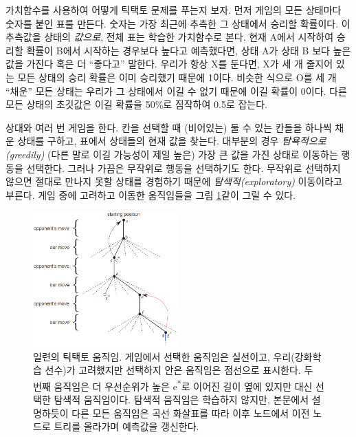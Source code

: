 가치함수를 사용하여 어떻게 틱택토 문제를 푸는지 보자. 먼저 게임의 모든 상태마다
숫자를 붙인 표를 만든다. 숫자는 가장 최근에 추측한 그 상태에서 승리할 확률이다.
이 추측값을 상태의 \emph{값으로}, 전체 표는 학습한 가치함수로 본다. 현재 A에서
시작하여 승리할 확률이 B에서 시작하는 경우보다 높다고 예측했다면, 상태 A가 상태
B 보다 높은 값을 가진다 혹은 더 ``좋다고'' 말한다. 우리가 항상 X를 둔다면, X가
세 개 줄지어 있는 모든 상태의 승리 확률은 이미 승리했기 때문에 1이다. 비슷한
식으로 O를 세 개 ``채운'' 모든 상태는 우리가 그 상태에서 이길 수 없기 때문에
이길 확률이 0이다. 다른 모든 상태의 초깃값은 이길 확률을 50\%로 짐작하여 0.5로
잡는다.

상대와 여러 번 게임을 한다. 칸을 선택할 때 (비어있는) 둘 수 있는 칸들을 하나씩
채운 상태를 구하고, 표에서 상태들의 현재 값을 찾는다. 대부분의 경우
\emph{탐욕적으로(greedily)} (다른 말로 이길 가능성이 제일 높은) 가장 큰 값을
가진 상태로 이동하는 행동을 선택한다. 그러나 가끔은 무작위로 행동을 선택하기도
한다. 무작위로 선택하지 않으면 절대로 만나지 못할 상태를 경험하기 때문에
\emph{탐색적(exploratory)} 이동이라고 부른다. 게임 중에 고려하고 이동한
움직임들을 그림 \ref{fig:sequence-of-tic-tac-toe-moves}\과 같이 그릴 수 있다.


\begin{figure}[h]
\centering
\includegraphics[width=0.5\textwidth]{img/figure_1_sequences_of_tic_tac_toe_moves.png}
\caption{\label{fig:sequence-of-tic-tac-toe-moves}일련의 틱택토 움직임. 게임에서
선택한 움직임은 실선이고, 우리(강화학습 선수)가 고려했지만 선택하지 안은
움직임은 점선으로 표시한다. 두 번째 움직임은 더 우선순위가 높은
e\textsuperscript{$\ast$}로 이어진 길이 옆에 있지만 대신 선택한 탐색적
움직임이다. 탐색적 움직임은 학습하지 않지만, 본문에서 설명하듯이 다른 모든
움직임은 곡선 화살표를 따라 이후 노드에서 이전 노드로 트리를 올라가며 예측값을
갱신한다.}
\end{figure}

